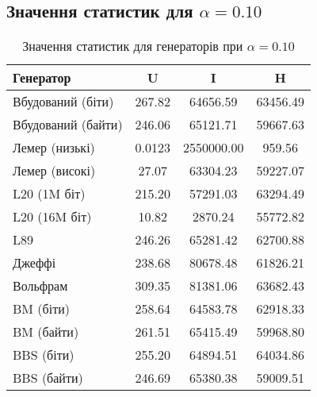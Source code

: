 \documentclass[12pt]{article}
\begin{document}
\subsection{Значення статистик для $\alpha = 0.10$}
\begin{table}[htbp]
\centering
\small
\begin{tabular}{l*{3}{c}}
\toprule
\textbf{Генератор} & \textbf{U} & \textbf{I} & \textbf{H} \\
\midrule
Вбудований (біти)  & 267.82 & 64656.59 & 63456.49 \\
Вбудований (байти) & 246.06 & 65121.71 & 59667.63 \\
Лемер (низькі)     & 0.0123 & 2550000.00 & 959.56 \\
Лемер (високі)     & 27.07 & 63304.23 & 59227.07 \\
L20 (1M біт)       & 215.20 & 57291.03 & 63294.49 \\
L20 (16M біт)      & 10.82 & 2870.24 & 55772.82 \\
L89                & 246.26 & 65281.42 & 62700.88 \\
Джеффі             & 238.68 & 80678.48 & 61826.21 \\
Вольфрам           & 309.35 & 81381.06 & 63682.43 \\
BM (біти)          & 258.64 & 64583.78 & 62918.33 \\
BM (байти)         & 261.51 & 65415.49 & 59968.80 \\
BBS (біти)         & 255.20 & 64894.51 & 64034.86 \\
BBS (байти)        & 246.69 & 65380.38 & 59009.51 \\
\bottomrule
\end{tabular}
\caption{Значення статистик для генераторів при $\alpha = 0.10$}
\label{tab:statistics_alpha_10}
\end{table}
\end{document}
